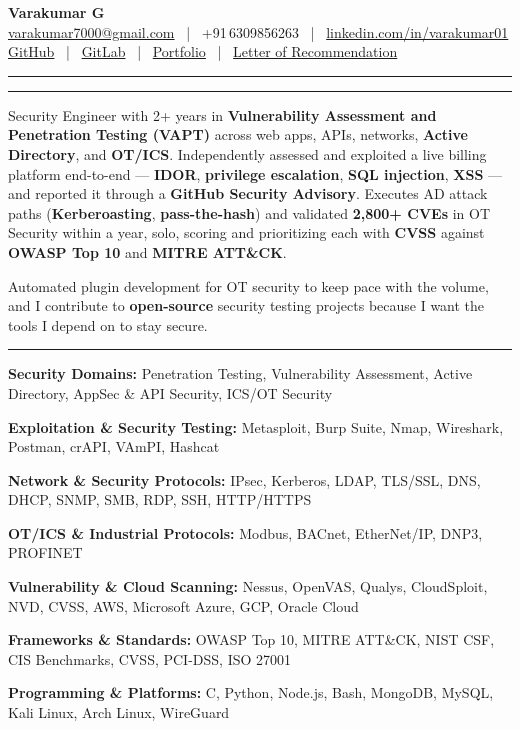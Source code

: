 \documentclass[9pt,a4paper]{extarticle}
\newcommand{\resumeSection}[1]{%
  \vspace{5pt}%
  \noindent{\large\bfseries\MakeUppercase{#1}}\par%
  \vspace{-7pt}%
  \noindent\rule{\textwidth}{0.5pt}%
  \par\vspace{0pt}%
}
\newcommand{\techrow}[2]{\noindent\textbf{#1} #2\par}
\begin{document}

\vspace*{-8pt}
\begin{center}
  {\LARGE\bfseries Varakumar G}\\[2pt]
  \href{mailto:varakumar7000@gmail.com}{varakumar7000@gmail.com}
  ~|~ +91\,6309856263
  ~|~ \href{https://www.linkedin.com/in/varakumar01}{linkedin.com/in/varakumar01}\\[1pt]
  \href{https://github.com/varakumar01}{GitHub}
  ~|~ \href{https://gitlab.com/Tony_01}{GitLab}
  ~|~ \href{https://portfolio.dragnux.com}{Portfolio}
  ~|~ \href{https://drive.google.com/file/d/17c5RtAgWn5TdRQUxnDIvLQogPoUoxgO_/view?pli=1}{Letter of Recommendation}
\end{center}
\vspace{-1pt}\noindent\rule{\textwidth}{0.7pt}

\resumeSection{Professional Summary}

Security Engineer with 2+ years in \textbf{Vulnerability Assessment and Penetration Testing (VAPT)} across web apps, APIs, networks, \textbf{Active Directory}, and \textbf{OT/ICS}. Independently assessed and exploited a live billing platform end-to-end — \textbf{IDOR}, \textbf{privilege escalation}, \textbf{SQL injection}, \textbf{XSS} — and reported it through a \textbf{GitHub Security Advisory}. Executes AD attack paths (\textbf{Kerberoasting}, \textbf{pass-the-hash}) and validated \textbf{2,800+ CVEs} in OT Security within a year, solo, scoring and prioritizing each with \textbf{CVSS} against \textbf{OWASP Top 10} and \textbf{MITRE ATT\&CK}.

Automated plugin development for OT security to keep pace with the volume, and I contribute to \textbf{open-source} security testing projects because I want the tools I depend on to stay secure.

\resumeSection{Technical Skills}

\techrow{Security Domains:}{Penetration Testing, Vulnerability Assessment, Active Directory, AppSec \& API Security, ICS/OT Security}
\techrow{Exploitation \& Security Testing:}{Metasploit, Burp Suite, Nmap, Wireshark, Postman, crAPI, VAmPI, Hashcat}
\techrow{Network \& Security Protocols:}{IPsec, Kerberos, LDAP, TLS/SSL, DNS, DHCP, SNMP, SMB, RDP, SSH, HTTP/HTTPS}
\techrow{OT/ICS \& Industrial Protocols:}{Modbus, BACnet, EtherNet/IP, DNP3, PROFINET}
\techrow{Vulnerability \& Cloud Scanning:}{Nessus, OpenVAS, Qualys, CloudSploit, NVD, CVSS, AWS, Microsoft Azure, GCP, Oracle Cloud}
\techrow{Frameworks \& Standards:}{OWASP Top 10, MITRE ATT\&CK, NIST CSF, CIS Benchmarks, CVSS, PCI-DSS, ISO 27001}
\techrow{Programming \& Platforms:}{C, Python, Node.js, Bash, MongoDB, MySQL, Kali Linux, Arch Linux, WireGuard}
\end{document}
